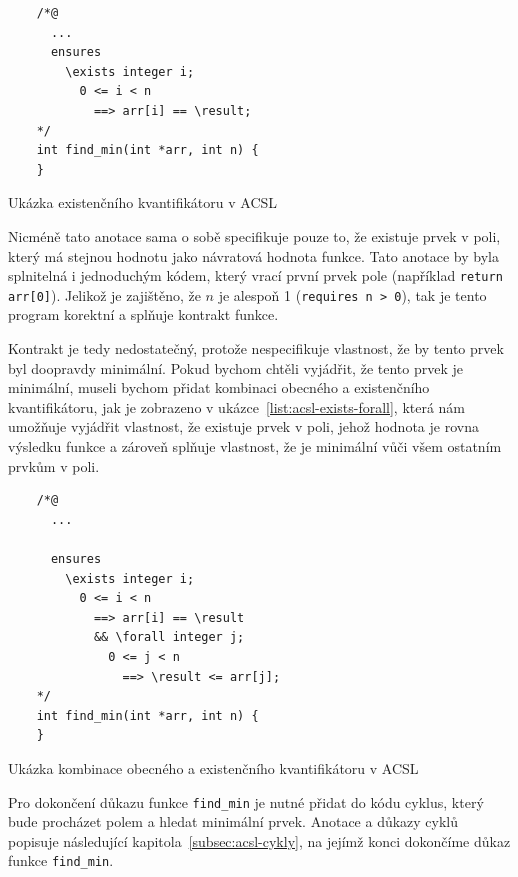 \begin{listing}[H]
    \begin{verbatim}
    /*@
      ...
      ensures
        \exists integer i;
          0 <= i < n
            ==> arr[i] == \result;
    */
    int find_min(int *arr, int n) {
    }
    \end{verbatim}
    \caption{Ukázka existenčního kvantifikátoru v ACSL}
    \label{list:acsl-exists}
\end{listing}

Nicméně tato anotace sama o sobě specifikuje pouze to, že existuje prvek v poli,
který má stejnou hodnotu jako návratová hodnota funkce.
Tato anotace by byla splnitelná i jednoduchým kódem, který vrací první prvek pole (například \texttt{return arr[0]}).
Jelikož je zajištěno, že $n$ je alespoň 1 (\texttt{requires~n~>~0}),
tak je tento program korektní a splňuje kontrakt funkce.



Kontrakt je tedy nedostatečný, protože nespecifikuje vlastnost,
že by tento prvek byl doopravdy minimální.
Pokud bychom chtěli vyjádřit, že tento prvek je minimální,
museli bychom přidat kombinaci obecného a existenčního kvantifikátoru,
jak je zobrazeno v ukázce~\ref{list:acsl-exists-forall},
která nám umožňuje vyjádřit vlastnost, že existuje prvek v poli,
jehož hodnota je rovna výsledku funkce a zároveň splňuje vlastnost,
že je minimální vůči všem ostatním prvkům v poli.

\begin{listing}[H]
    \begin{verbatim}
    /*@
      ...

      ensures
        \exists integer i;
          0 <= i < n
            ==> arr[i] == \result
            && \forall integer j;
              0 <= j < n
                ==> \result <= arr[j];
    */
    int find_min(int *arr, int n) {
    }
    \end{verbatim}
    \caption{Ukázka kombinace obecného a existenčního kvantifikátoru v ACSL}
    \label{list:acsl-exists-forall}
\end{listing}

Pro dokončení důkazu funkce \texttt{find\_min} je nutné přidat do kódu cyklus,
který bude procházet polem a hledat minimální prvek.
Anotace a důkazy cyklů popisuje následující kapitola~\ref{subsec:acsl-cykly},
na jejímž konci dokončíme důkaz funkce \texttt{find\_min}.

